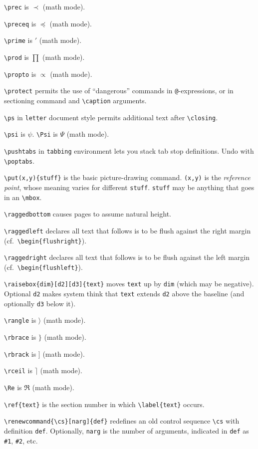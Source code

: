 \verb"\prec" is $\prec$ (math mode).

\verb"\preceq" is $\preceq$ (math mode).

\verb"\prime" is $\prime$ (math mode).

\verb"\prod" is $\prod$ (math mode).

\verb"\propto" is $\propto$ (math mode).

\verb"\protect" permits the use of ``dangerous'' commands in
	\verb"@"-expressions, or in sectioning command and \verb"\caption"
	arguments.

\verb"\ps" in \verb"letter" document style permits additional text after
	\verb"\closing".

\verb"\psi" is $\psi$. \verb"\Psi" is $\Psi$ (math mode).

\verb"\pushtabs" in \verb"tabbing" environment lets you stack tab stop
	definitions.  Undo with \verb"\poptabs".

\verb"\put(x,y){stuff}" is the basic picture-drawing command.
	\verb"(x,y)" is the {\em reference point}, whose meaning varies
	for different \verb"stuff".  \verb"stuff" may be anything
	that goes in an \verb"\mbox".

\verb"\raggedbottom" causes pages to assume natural height.

\verb"\raggedleft" declares all text that follows is to be flush against
	the right margin (cf.\ \verb"\begin{flushright}").

\verb"\raggedright" declares all text that follows is to be flush against
	the left margin (cf.\ \verb"\begin{flushleft}").

\verb"\raisebox{dim}[d2][d3]{text}" moves \verb"text" up by \verb"dim"
	(which may be negative). Optional \verb"d2" makes system think
	that \verb"text" extends \verb"d2" above the baseline (and optionally
	\verb"d3" below it).

\verb"\rangle" is $\rangle$ (math mode).

\verb"\rbrace" is $\rbrace$ (math mode).

\verb"\rbrack" is $\rbrack$ (math mode).

\verb"\rceil" is $\rceil$ (math mode).

\verb"\Re" is $\Re$ (math mode).

\verb"\ref{text}" is the section number in which \verb"\label{text}" occurs.

\verb"\renewcommand{\cs}[narg]{def}" redefines an old control sequence
	\verb"\cs" with definition \verb"def". Optionally, \verb"narg" is
	the number of arguments, indicated in \verb"def" as \verb"#1",
	\verb"#2", etc.

